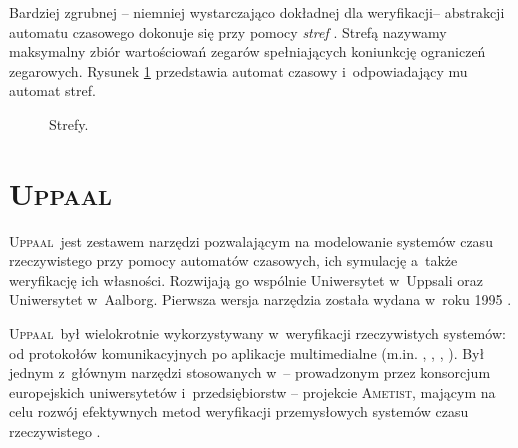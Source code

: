\documentclass{pracamgr}
\newcommand{\upp}{\textsc{Uppaal}}
\theoremstyle{plain}
\begin{document}
Bardziej zgrubnej -- niemniej wystarczająco dokładnej dla
weryfikacji-- abstrakcji automatu czasowego dokonuje się przy pomocy
\emph{stref} \cite{henz-94}. Strefą nazywamy maksymalny zbiór
wartościowań zegarów spełniających koniunkcję ograniczeń zegarowych.
Rysunek \ref{img:zones} przedstawia automat czasowy i~odpowiadający mu
automat stref.

\begin{figure}
  \centering
   \hspace{1cm}
  \caption{Strefy.}
  \label{img:zones}
\end{figure}

\section{\upp}
\label{uppaal}

\upp\ jest zestawem narzędzi pozwalającym na modelowanie systemów czasu
rzeczywistego przy pomocy automatów czasowych, ich symulację a~także
weryfikację ich własności. Rozwijają go wspólnie Uniwersytet w~Uppsali
oraz Uniwersytet w~Aalborg. Pierwsza wersja narzędzia została wydana w~roku
1995 \cite{lpw:fct95}.

\upp\ był wielokrotnie wykorzystywany w~weryfikacji rzeczywistych
systemów: od protokołów komunikacyjnych po aplikacje multimedialne
(m.in. \cite{lp:prfts97}, \cite{lpw:tacas98},
\cite{DBLP:conf/icfem/BordbarO03},
\cite{Ravn:2011:MVW:1987389.1987431}). Był jednym z~głównym narzędzi
stosowanych w~-- prowadzonym przez konsorcjum europejskich
uniwersytetów i~przedsiębiorstw -- projekcie \textsc{Ametist}, mającym
na celu rozwój efektywnych metod weryfikacji przemysłowych systemów czasu
rzeczywistego \cite{AMETISTfinal}.
\end{document}
